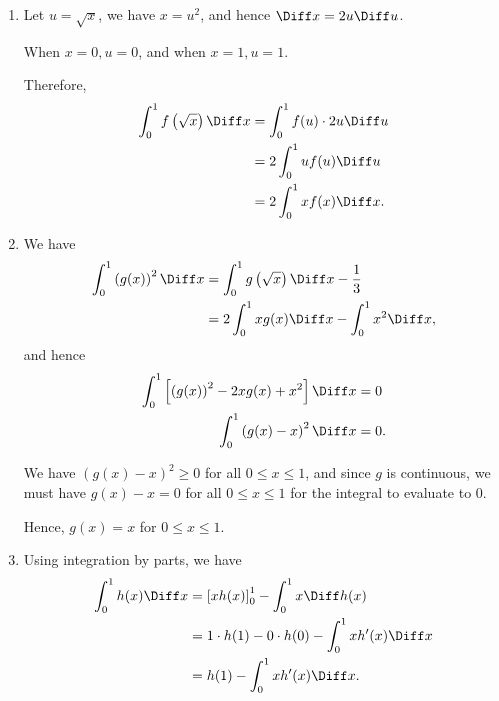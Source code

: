 \Question{\currfilebase}

\begin{enumerate}
    \item Let \(u = \sqrt{x}\), we have \(x = u^2\), and hence \(\Diff x = 2u \Diff u\).

          When \(x = 0, u = 0\), and when \(x = 1, u = 1\).

          Therefore,
          \begin{align*}
              \int_{0}^{1} f\left(\sqrt{x}\right)\Diff x & = \int_{0}^{1} f(u) \cdot 2u \Diff u \\
                                                         & = 2 \int_{0}^{1} u f(u) \Diff u      \\
                                                         & = 2 \int_{0}^{1} x f(x) \Diff x.
          \end{align*}

    \item We have
          \begin{align*}
              \int_{0}^{1} \left(g(x)\right)^2 \Diff x & = \int_{0}^{1} g\left(\sqrt{x}\right) \Diff x - \frac{1}{3} \\
                                                       & = 2 \int_{0}^{1} x g(x) \Diff x - \int_{0}^{1} x^2 \Diff x,
          \end{align*}
          and hence
          \begin{align*}
              \int_{0}^{1} \left[\left(g(x)\right)^2 - 2x g(x) + x^2\right] \Diff x & = 0  \\
              \int_{0}^{1} \left(g(x) - x\right)^2 \Diff x                          & = 0.
          \end{align*}

          We have \(\left(g(x) - x\right)^2 \geq 0\) for all \(0 \leq x \leq 1\), and since \(g\) is continuous, we must have \(g(x) - x = 0\) for all \(0 \leq x \leq 1\) for the integral to evaluate to \(0\).

          Hence, \(g(x) = x\) for \(0 \leq x \leq 1\).

    \item Using integration by parts, we have
          \begin{align*}
              \int_{0}^{1} h(x) \Diff x & = \left[x h(x)\right]_{0}^{1} - \int_{0}^{1} x \Diff h(x)    \\
                                        & = 1 \cdot h(1) - 0 \cdot h(0) - \int_{0}^{1} x h'(x) \Diff x \\
                                        & = h(1) - \int_{0}^{1} x h'(x) \Diff x.
          \end{align*}


\end{enumerate}
